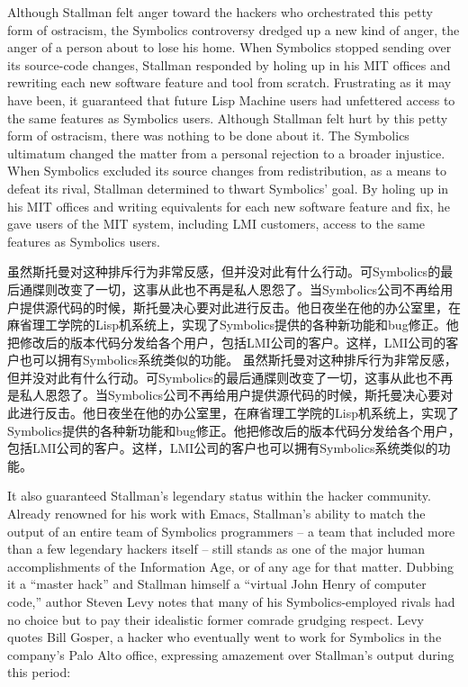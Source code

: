 \ifdefined\eng
\ifdefined\vone
Although Stallman felt anger toward the hackers who orchestrated this petty form of ostracism, the Symbolics controversy dredged up a new kind of anger, the anger of a person about to lose his home. When Symbolics stopped sending over its source-code changes, Stallman responded by holing up in his MIT offices and rewriting each new software feature and tool from scratch. Frustrating as it may have been, it guaranteed that future Lisp Machine users had unfettered access to the same features as Symbolics users.
\fi
\ifdefined\vtwo
Although Stallman felt hurt by this petty form of ostracism, there was nothing to be done about it.  The Symbolics ultimatum changed the matter from a personal rejection to a broader injustice. When Symbolics excluded its source changes from redistribution, as a means to defeat its rival, Stallman determined to thwart Symbolics' goal. By holing up in his MIT offices and writing equivalents for each new software feature and fix, he gave users of the MIT system, including LMI customers, access to the same features as Symbolics users.
\fi
\fi

\ifdefined\chs
\ifdefined\vone
虽然斯托曼对这种排斥行为非常反感，但并没对此有什么行动。可Symbolics的最后通牒则改变了一切，这事从此也不再是私人恩怨了。当Symbolics公司不再给用户提供源代码的时候，斯托曼决心要对此进行反击。他日夜坐在他的办公室里，在麻省理工学院的Lisp机系统上，实现了Symbolics提供的各种新功能和bug修正。他把修改后的版本代码分发给各个用户，包括LMI公司的客户。这样，LMI公司的客户也可以拥有Symbolics系统类似的功能。
\fi
\ifdefined\vtwo
虽然斯托曼对这种排斥行为非常反感，但并没对此有什么行动。可Symbolics的最后通牒则改变了一切，这事从此也不再是私人恩怨了。当Symbolics公司不再给用户提供源代码的时候，斯托曼决心要对此进行反击。他日夜坐在他的办公室里，在麻省理工学院的Lisp机系统上，实现了Symbolics提供的各种新功能和bug修正。他把修改后的版本代码分发给各个用户，包括LMI公司的客户。这样，LMI公司的客户也可以拥有Symbolics系统类似的功能。
\fi
\fi

\ifdefined\eng
It also guaranteed Stallman's legendary status within the hacker community. Already renowned for his work with Emacs, Stallman's ability to match the output of an entire team of Symbolics programmers -- a team that included more than a few legendary hackers itself -- still stands as one of the major human accomplishments of the Information Age, or of any age for that matter. Dubbing it a ``master hack'' and Stallman himself a ``virtual John Henry of computer code,'' author Steven Levy notes that many of his Symbolics-employed rivals had no choice but to pay their idealistic former comrade grudging respect. Levy quotes Bill Gosper, a hacker who eventually went to work for Symbolics in the company's Palo Alto office, expressing amazement over Stallman's output during this period:
\fi

